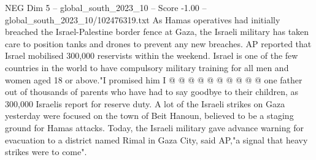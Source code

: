 \begin{textsample}{NEG Dim 5 – global\_south\_2023\_10 – Score -1.00 – global\_south\_2023\_10/102476319.txt}
As Hamas operatives had initially breached the Israel-Palestine border fence at Gaza, the Israeli military has taken care to position tanks and drones to prevent any new breaches.
AP reported that Israel mobilised 300,000 reservists within the weekend.
Israel is one of the few countries in the world to have compulsory military training for all men and women aged 18 or above."I promised him I @ @ @ @ @ @ @ @ @ @ one father out of thousands of parents who have had to say goodbye to their children, as 300,000 Israelis report for reserve duty.
A lot of the Israeli strikes on Gaza yesterday were focused on the town of Beit Hanoun, believed to be a staging ground for Hamas attacks.
Today, the Israeli military gave advance warning for evacuation to a district named Rimal in Gaza City, said AP,"a signal that heavy strikes were to come".

\end{textsample}
